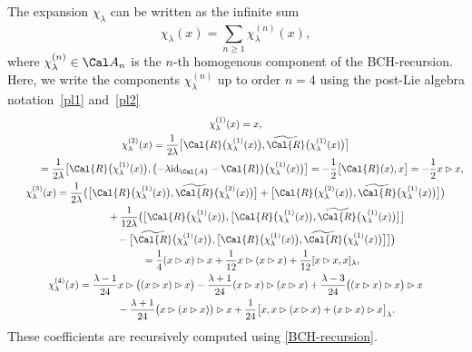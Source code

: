 \documentclass[10pt,a4paper]{amsart}
\numberwithin{equation}{section}
\begin{document}
The expansion $\chi_{\lambda}$ can be written as the infinite sum
\begin{equation*}
\chi^{}_{\lambda}(x) = \sum_{n \ge 1}^{}{\chi_{\lambda}^{(n)}(x)},
\end{equation*}
where $\chi_{\lambda}^{(n)}\in\Cal A_n$ is the $n$-th homogenous component of the BCH-recursion. Here, we write the components $\chi_{\lambda}^{(n)}$ up to order $n =4$ using the post-Lie algebra notation~\eqref{pl1} and~\eqref{pl2}
\begin{gather*}
\chi_{\lambda}^{(1)}(x) = x,
\\
\chi_{\lambda}^{(2)}(x) = \frac{1}{2\lambda} \big[\Cal{R}\big(\chi_{\lambda}^{(1)}(x)\big), \widetilde{\Cal{R}}\big(\chi_{\lambda}^{(1)}(x)\big)\big]
\\ \hphantom{\chi_{\lambda}^{(2)}(x) }
{}= \frac{1}{2\lambda} \big[\Cal{R}\big(\chi_{\lambda}^{(1)}(x)\big), \big({-}\lambda {\rm id}_{\Cal{A}}
- \Cal{R} \big)\big(\chi_{\lambda}^{(1)}(x)\big)\big]
 = - \frac{1}{2} \big[\Cal{R}(x), x\big]= - \frac{1}{2} x \rhd x,
 \\
\chi_{\lambda}^{(3)}(x)
= \frac{1}{2 \lambda} \big(\big[\Cal{R}\big(\chi_{\lambda}^{(1)}(x)\big), \widetilde{\Cal{R}}\big(\chi_{\lambda}^{(2)}(x)\big)\big]
+ \big[\Cal{R}\big(\chi_{\lambda}^{(2)}(x)\big), \widetilde{\Cal{R}}\big(\chi_{\lambda}^{(1)}(x)\big)\big]\big)
\\ \hphantom{\chi_{\lambda}^{(3)}(x)=}
{}+ \frac{1}{12 \lambda}\big(\big[\Cal{R}\big(\chi_{\lambda}^{(1)}(x)\big),\big[\Cal{R}\big(\chi_{\lambda}^{(1)}(x)\big), \widetilde{\Cal{R}}\big(\chi_{\lambda}^{(1)}(x)\big)\big]\big]
\\ \hphantom{\chi_{\lambda}^{(3)}(x)=}
{}- \big[\widetilde{\Cal{R}}\big(\chi_{\lambda}^{(1)}(x)\big),\big[\Cal{R}\big(\chi_{\lambda}^{(1)}(x)\big), \widetilde{\Cal{R}}\big(\chi_{\lambda}^{(1)}(x)\big)\big]\big]\big)
\\ \hphantom{\chi_{\lambda}^{(3)}(x)}
{} = \frac{1}{4} ( x \rhd x) \rhd x + \frac{1}{12}x \rhd (x \rhd x) + \frac{1}{12} [x\rhd x, x]_\lambda,
 \\
\chi_{\lambda}^{(4)}(x)= \frac{\lambda-1}{24} x \rhd \big((x \rhd x) \rhd x\big)
- \frac{\lambda + 1}{24} (x \rhd x) \rhd (x \rhd x)
+ \frac{\lambda -3}{24} \big((x \rhd x) \rhd x\big) \rhd x
\\ \hphantom{\chi_{\lambda}^{(4)}(x)=}
{}-\frac{\lambda + 1}{24} \big(x \rhd (x \rhd x)\big) \rhd x
+ \frac{1}{24} \big[x, x \rhd (x \rhd x) + (x \rhd x) \rhd x\big]_\lambda.
\end{gather*}
These coefficients are recursively computed using \eqref{BCH-recursion}.
\end{document}

